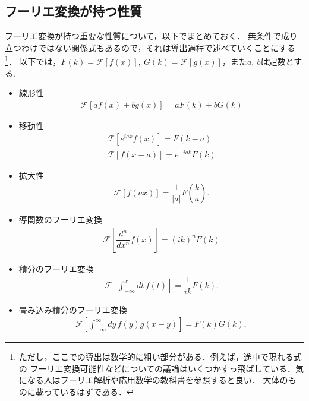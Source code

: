\subsection{フーリエ変換が持つ性質}
%
フーリエ変換が持つ重要な性質について，以下でまとめておく．
無条件で成り立つわけではない関係式もあるので，それは導出過程で述べていくことにする
\footnote{ただし，ここでの導出は数学的に粗い部分がある．例えば，途中で現れる式の
フーリエ変換可能性などについての議論はいくつかすっ飛ばしている．気になる人はフーリエ解析や応用数学の教科書を参照すると良い．
大体のものに載っているはずである．}．
以下では，$F\left(k\right) = \mathcal{F}\left[f\left(x\right)\right],~G\left(k\right) = \mathcal{F}\left[g\left(x\right)\right]$，また$a,~b$は定数とする.
\begin{itemize}
  \item 線形性 
	\begin{align}
	  \mathcal{F}\left[af\left(x\right) + bg\left(x\right)\right] = aF\left(k\right) + bG\left(k\right)
	\end{align}

  \item 移動性
	\begin{align}
	  \mathcal{F}\left[e^{iax}f\left(x\right)\right] = F\left(k-a\right) \\
	  \mathcal{F}\left[f\left(x-a\right)\right]      = e^{-iak}F\left(k\right)
	\end{align}
  \item 拡大性
	\begin{align}
	  \mathcal{F}\left[f\left(ax\right)\right] = \dfrac{1}{\left|a\right|}F\left(\dfrac{k}{a}\right). 
	\end{align}
  \item 導関数のフーリエ変換 
	\begin{align}
	  \mathcal{F}\left[\dfrac{d^n}{dx^n}f\left(x\right)\right] = \left(ik\right)^{n} F\left(k\right)
	\end{align}
  \item 積分のフーリエ変換
	\begin{align}
	  \mathcal{F}\left[\int_{-\infty}^{x} dt\, f\left(t\right)\right] = \dfrac{1}{ik}F\left(k\right).
	\end{align}
  \item 畳み込み積分のフーリエ変換
	\begin{align}
	  \mathcal{F}\left[\int_{-\infty}^{\infty}dy\,f\left(y\right)g\left(x-y\right)\right] = F\left(k\right)G\left(k\right), \label{fourier_convolution}
	\end{align}

\end{itemize}
%
